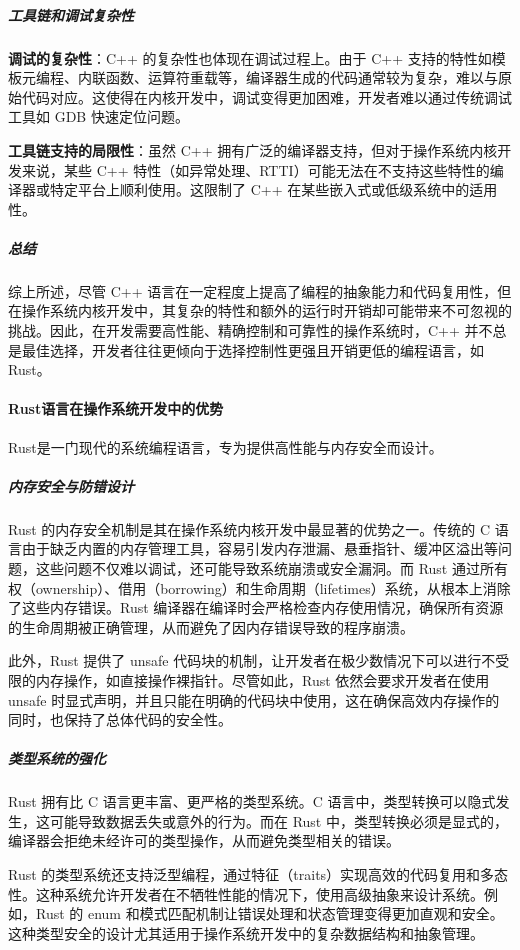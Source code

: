 \subparagraph{工具链和调试复杂性}

\textbf{调试的复杂性}：C++ 的复杂性也体现在调试过程上。由于 C++ 支持的特性如模板元编程、内联函数、运算符重载等，编译器生成的代码通常较为复杂，难以与原始代码对应。这使得在内核开发中，调试变得更加困难，开发者难以通过传统调试工具如 GDB 快速定位问题。

\textbf{工具链支持的局限性}：虽然 C++ 拥有广泛的编译器支持，但对于操作系统内核开发来说，某些 C++ 特性（如异常处理、RTTI）可能无法在不支持这些特性的编译器或特定平台上顺利使用。这限制了 C++ 在某些嵌入式或低级系统中的适用性。

\subparagraph{总结}

综上所述，尽管 C++ 语言在一定程度上提高了编程的抽象能力和代码复用性，但在操作系统内核开发中，其复杂的特性和额外的运行时开销却可能带来不可忽视的挑战。因此，在开发需要高性能、精确控制和可靠性的操作系统时，C++ 并不总是最佳选择，开发者往往更倾向于选择控制性更强且开销更低的编程语言，如 Rust。

\paragraph{Rust语言在操作系统开发中的优势}

Rust是一门现代的系统编程语言，专为提供高性能与内存安全而设计。

\subparagraph{内存安全与防错设计}

Rust 的内存安全机制是其在操作系统内核开发中最显著的优势之一。传统的 C 语言由于缺乏内置的内存管理工具，容易引发内存泄漏、悬垂指针、缓冲区溢出等问题，这些问题不仅难以调试，还可能导致系统崩溃或安全漏洞。而 Rust 通过所有权（ownership）、借用（borrowing）和生命周期（lifetimes）系统，从根本上消除了这些内存错误。Rust 编译器在编译时会严格检查内存使用情况，确保所有资源的生命周期被正确管理，从而避免了因内存错误导致的程序崩溃。

此外，Rust 提供了 unsafe 代码块的机制，让开发者在极少数情况下可以进行不受限的内存操作，如直接操作裸指针。尽管如此，Rust 依然会要求开发者在使用 unsafe 时显式声明，并且只能在明确的代码块中使用，这在确保高效内存操作的同时，也保持了总体代码的安全性。

\subparagraph{类型系统的强化}

Rust 拥有比 C 语言更丰富、更严格的类型系统。C 语言中，类型转换可以隐式发生，这可能导致数据丢失或意外的行为。而在 Rust 中，类型转换必须是显式的，编译器会拒绝未经许可的类型操作，从而避免类型相关的错误。

Rust 的类型系统还支持泛型编程，通过特征（traits）实现高效的代码复用和多态性。这种系统允许开发者在不牺牲性能的情况下，使用高级抽象来设计系统。例如，Rust 的 enum 和模式匹配机制让错误处理和状态管理变得更加直观和安全。这种类型安全的设计尤其适用于操作系统开发中的复杂数据结构和抽象管理。

